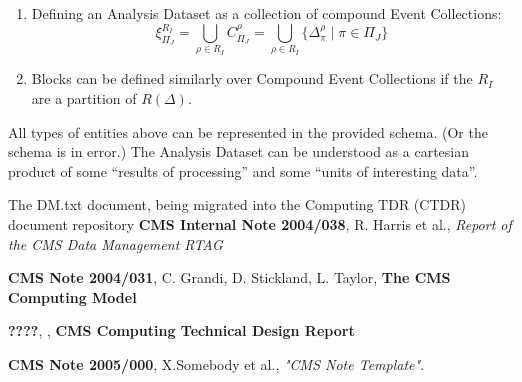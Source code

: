 \documentclass{cmspaper}
\begin{document}
\begin{enumerate}
\item Defining an Analysis Dataset as a collection of compound Event 
      Collections: 
\begin{equation}
\xi_{\Pi_J}^{R_I} = \bigcup_{\rho \in R_I} C_{\Pi_J}^{\rho} = \bigcup_{\rho \in R_I} \{ \Delta_{\pi}^{\rho} \mid \pi \in \Pi_J \}
\end{equation}

\item Blocks can be defined similarly over Compound Event Collections if the $R_I$ are a partition 
of $R(\Delta)$.

\end{enumerate}

All types of entities above can be represented in the provided schema.
(Or the schema is in error.)  The Analysis Dataset can be understood as
a cartesian product of some ``results of processing'' and some ``units
of interesting data''.


\begin{thebibliography}{9}
   The DM.txt document, being migrated into the Computing
      TDR (CTDR) document repository
   {\bf CMS Internal Note 2004/038}, R. Harris et al., 
    {\it Report of the CMS Data Management RTAG}

   {\bf CMS Note 2004/031}, C. Grandi, D. Stickland,
               L. Taylor, {\bf The CMS Computing Model}

   {\bf ????}, , {\bf CMS Computing Technical Design Report}

   {\bf CMS Note 2005/000},
    X.Somebody et al.,
    {\em "CMS Note Template"}.
\end{thebibliography}
 
\pagebreak
\end{document}
